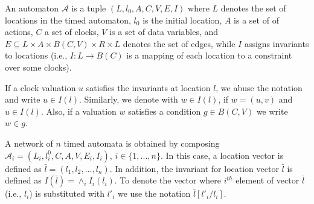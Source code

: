 \begin{definition}%
An automaton $\mathcal{A}$ is a tuple $(L,l_0,A,C,V,E,I)$ where $L$ denotes the set of locations in the timed automaton, $l_0$ is the initial location, $A$ is a set of of actions, $C$  a set of clocks, $V$ is a set of data variables, and $E\subseteq L\times A\times B(C,V)\times R \times L$ denotes the set of edges, while $I$ assigns invariants to locations (i.e., $I: L\rightarrow B(C)$ is a mapping of each location to a constraint over some clocks).
\end{definition}

If a clock valuation $u$ satisfies the invariants at location $l$, we abuse the notation and write $u\in I(l)$. Similarly, we denote with $w\in I(l)$, if $w=(u,v)$ and $u\in I(l)$. Also, if a valuation $w$ satisfies a condition $g\in B(C,V)$ we write $w\in g$. 

A network of $n$ timed automata is obtained by composing  $\mathcal{A}_i=(L_i,l_i^0,C,A,V,E_i,I_i)$, $i\in\{1,...,n\}$. In this case, a location vector is defined as $\bar{l}=(l_1,l_2,...,l_n)$. In addition, the invariant for location vector $\bar{l}$ is defined as $I(\bar{l})=\wedge_i I_i(l_i)$. To denote the vector where $i^{th}$ element of vector $\bar{l}$ (i.e., $l_i$) is substituted with $l'_{i}$ we use the notation $\bar{l}[l'_i/l_i]$. 

